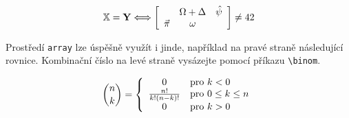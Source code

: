 \documentclass[twocolumn, 11pt, a4paper]{article}
\begin{document}
$$
\mathbb{X} = \mathbf{Y} \Longleftrightarrow
\left[
    \begin{array}[pos]{ccc}
        & \Omega + \Delta & \hat{\psi} \\
        \vec \pi & \omega & 
    \end{array}
\right]
\neq 42
$$

Prostředí \verb|array| lze úspěšně využít i jinde, například na pravé straně následující rovnice. 
Kombinační číslo na levé straně vysázejte pomocí příkazu \verb|\binom|.

\begin{displaymath}
    \binom{n}{k} = 
    \left\{
        \begin{array}{c l}
            0 & \text{pro } k < 0 \\
            \frac{n!}{k!(n-k)!} & \text{pro } 0 \leq k \leq n \\
            0 & \text{pro } k > 0
        \end{array} 
    \right.
\end{displaymath}
\end{document}
